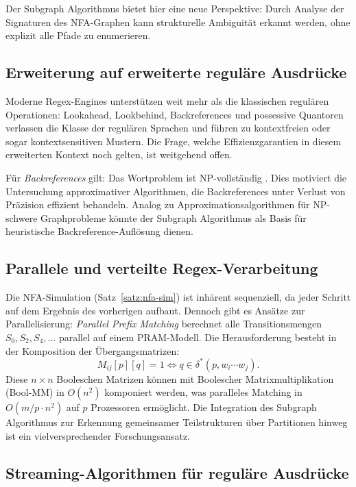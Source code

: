 ﻿\documentclass[a4paper,12pt]{article}
\theoremstyle{definition}
\begin{document}
Der Subgraph Algorithmus bietet hier eine neue Perspektive: Durch Analyse der
Signaturen des NFA-Graphen kann strukturelle Ambiguität erkannt werden, ohne
explizit alle Pfade zu enumerieren.

\subsection{Erweiterung auf erweiterte reguläre Ausdrücke}

Moderne Regex-Engines unterstützen weit mehr als die klassischen regulären
Operationen: Lookahead, Lookbehind, Backreferences und possessive Quantoren
verlassen die Klasse der regulären Sprachen und führen zu kontextfreien oder
sogar kontextsensitiven Mustern. Die Frage, welche Effizienzgarantien in diesem
erweiterten Kontext noch gelten, ist weitgehend offen.

Für \emph{Backreferences} gilt: Das Wortproblem ist NP-vollständig \cite{aho1990}.
Dies motiviert die Untersuchung approximativer Algorithmen, die Backreferences
unter Verlust von Präzision effizient behandeln. Analog zu Approximationsalgorithmen
für NP-schwere Graphprobleme könnte der Subgraph Algorithmus als
Basis für heuristische Backreference-Auflösung dienen.

\subsection{Parallele und verteilte Regex-Verarbeitung}

Die NFA-Simulation (Satz~\ref{satz:nfa-sim}) ist inhärent sequenziell, da jeder
Schritt auf dem Ergebnis des vorherigen aufbaut. Dennoch gibt es Ansätze zur
Parallelisierung: \emph{Parallel Prefix Matching} berechnet alle
Transitionsmengen $S_0, S_2, S_4, \ldots$ parallel auf einem PRAM-Modell.
Die Herausforderung besteht in der Komposition der Übergangsmatrizen:
\[
	M_{ij}[p][q] = 1 \Leftrightarrow q \in \delta^*(p, w_i \cdots w_j).
\]
Diese $n \times n$ Booleschen Matrizen können mit Boolescher Matrixmultiplikation
(Bool-MM) in $O(n^2)$ komponiert werden, was paralleles Matching in
$O(m/p \cdot n^2)$ auf $p$ Prozessoren ermöglicht. Die Integration des
Subgraph Algorithmus zur Erkennung gemeinsamer Teilstrukturen über Partitionen
hinweg ist ein vielversprechender Forschungsansatz.

\subsection{Streaming-Algorithmen für reguläre Ausdrücke}
\end{document}
